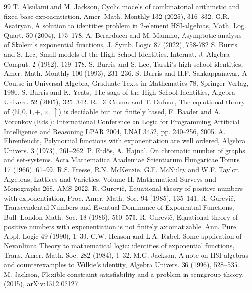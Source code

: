 \documentclass[eqnor,reqno]{amsart}
\theoremstyle{plain}
\theoremstyle{definition}
\begin{document}
\begin{thebibliography}{99}
 T. Alsulami and M. Jackson, Cyclic models of combinatorial arithmetic and  fixed base exponentiation, Amer. Math. Monthly 132 (2025), 316--332. 
 G.R. Asatryan, A solution to identities problem in 2-element HSI-algebras, {Math. Log. Quart.}  50 (2004), 175--178.
 A. Berarducci and M. Mamino, Asymptotic analysis of Skolem's exponential functions, J. Symb. Logic 87 (2022), 758-782
 S. Burris and S. Lee, Small models of the High
School Identities. {Internat. J. Algebra Comput.} 2 (1992), 139--178.
 S. Burris and S. Lee, Tarski's high school identities, {Amer. Math. Monthly} 100 (1993), 231--236.
  S. Burris and H.P. Sankappanavar, {A Course in Universal
Algebra}, Graduate Texts in Mathematics {78}, Springer Verlag, 1980.
 S. Burris and K. Yeats,  The saga of the High
School Identities, {Algebra Univers.} 52 (2005), 325--342.
 R. Di Cosma and T. Dufour, The equational theory of $\langle \mathbb{N},0,1,+,\times,\uparrow\rangle$ is decidable but not finitely based, F. Baader and A. Voronkov (Eds.): International Conference on Logic for Programming Artificial Intelligence and Reasoning LPAR 2004, LNAI 3452, pp. 240--256, 2005.
 A. Ehrenfeucht, Polynomial functions with exponentiation are well ordered, Algebra Univers. 3 (1973), 261--262.
 P. Erd\H{o}s, A. Hajnal, On chromatic number of graphs and set-systems. Acta Mathematica Academiae Scientiarum Hungaricae Tomus 17 (1966), 61--99.
 R.S. Freese, R.N. McKenzie, G.F. McNulty and W.F. Taylor, Algebras, Lattices and Varieties, Volume II, Mathematical Surveys and Monographs 268, AMS 2022.
 R. Gurevi\v{c}, Equational theory of positive numbers with exponentiation, {Proc. Amer. Math. Soc.} 94 (1985), 135--141.
  R. Gurevi\v{c}, Transcendental Numbers and Eventual Dominance of Exponential Functions, Bull. London Math. Soc. 18 (1986), 560--570.
 R. Gurevi\v{c}, Equational theory of positive numbers with exponentiation is not finitely axiomatizable, {Ann. Pure Appl. Logic} 49  (1990), 1--30.
 C.W. Henson and L.A. Rubel, Some application of Nevanlinna Theory to mathematical logic: identities of exponential
functions, Trans. Amer. Math. Soc. 282 (1984), 1--32.
 M.G. Jackson, A note on HSI-algebras and counterexamples to Wilkie's identity, Algebra Univers. 36 (1996),  528--535.
 M. Jackson, Flexible constraint satisfiability and a problem in semigroup theory, (2015), arXiv:1512.03127.

\end{thebibliography}
\end{document}
